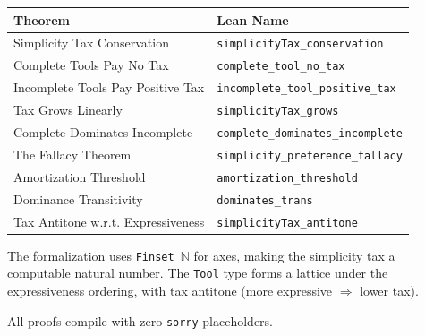\begin{center}
\begin{tabular}{ll}
\toprule
\textbf{Theorem} & \textbf{Lean Name} \\
\midrule
Simplicity Tax Conservation & \texttt{simplicityTax\_conservation} \\
Complete Tools Pay No Tax & \texttt{complete\_tool\_no\_tax} \\
Incomplete Tools Pay Positive Tax & \texttt{incomplete\_tool\_positive\_tax} \\
Tax Grows Linearly & \texttt{simplicityTax\_grows} \\
Complete Dominates Incomplete & \texttt{complete\_dominates\_incomplete} \\
The Fallacy Theorem & \texttt{simplicity\_preference\_fallacy} \\
Amortization Threshold & \texttt{amortization\_threshold} \\
Dominance Transitivity & \texttt{dominates\_trans} \\
Tax Antitone w.r.t. Expressiveness & \texttt{simplicityTax\_antitone} \\
\bottomrule
\end{tabular}
\end{center}

The formalization uses \texttt{Finset $\mathbb{N}$} for axes, making the simplicity tax a computable natural number. The \texttt{Tool} type forms a lattice under the expressiveness ordering, with tax antitone (more expressive $\Rightarrow$ lower tax).

All proofs compile with zero \texttt{sorry} placeholders.
